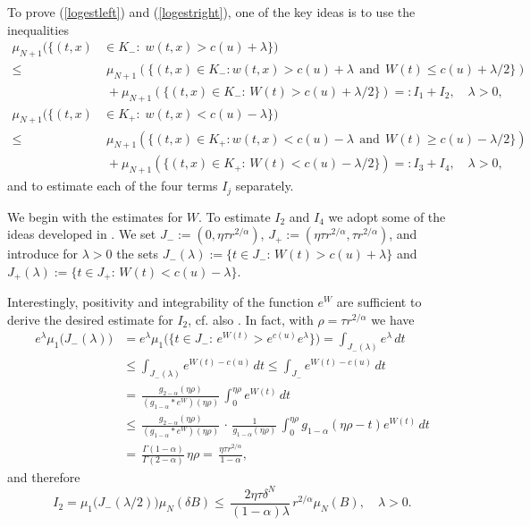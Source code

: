\documentclass[10pt]{article}
\begin{document}
To prove (\ref{logestleft}) and (\ref{logestright}), one of the
key ideas is to use the inequalities
\begin{align}
\mu_{N+1}(\{(t,x) & \in K_-:\; w(t,x)>c(u)+\lambda\})\nonumber\\
\le &\;\mu_{N+1}(\{(t,x)\in K_-:
w(t,x)>c(u)+\lambda\;\,\mbox{and}\,\;W(t)\le c(u)+\lambda/2 \})\nonumber\\
&\; +\mu_{N+1}(\{(t,x)\in K_-:\,W(t)> c(u)+\lambda/2
\})=:I_1+I_2,\quad \lambda>0,\label{mainleft}\\
\mu_{N+1}(\{(t,x) & \in K_+:\; w(t,x)<c(u)-\lambda\})\nonumber\\
\le &\;\mu_{N+1}(\{(t,x)\in K_+:
w(t,x)<c(u)-\lambda\;\,\mbox{and}\,\;W(t)\ge c(u)-\lambda/2 \})\nonumber\\
&\; +\mu_{N+1}(\{(t,x)\in K_+:\,W(t)< c(u)-\lambda/2
\})=:I_3+I_4,\quad \lambda>0,\label{mainright}
\end{align}
and to estimate each of the four terms $I_j$ separately.

We begin with the estimates for $W$. To estimate $I_2$ and $I_4$ we
adopt some of the ideas developed in \cite{Za}. We set $J_-:=(0,\eta
\tau r^{2/\alpha})$, $J_+:=(\eta\tau r^{2/\alpha},\tau
r^{2/\alpha})$, and introduce for $\lambda>0$ the sets
$J_-(\lambda):=\{t\in J_-:\,W(t)> c(u)+\lambda \}$ and
$J_+(\lambda):=\{t\in J_+:\,W(t)< c(u)-\lambda \}$.

Interestingly, positivity and integrability of the function $e^W$
are sufficient to derive the desired estimate for $I_2$, cf. also
\cite[Theorem 2.3]{Za}. In fact, with $\rho=\tau r^{2/\alpha}$ we
have
\begin{align*}
e^\lambda \mu_1\big(J_-(\lambda)\big) & =
e^\lambda\mu_1\big(\{t\in J_-:\,
e^{W(t)}>e^{c(u)}e^{\lambda}\}\big)=\int_{J_-(\lambda)}e^\lambda \,dt\\
& \le \int_{J_-(\lambda)}e^{W(t)-c(u)} \,dt\le
\int_{J_-}e^{W(t)-c(u)} \,dt\\
& = \,\frac{g_{2-\alpha}(\eta\rho)}{(g_{1-\alpha}\ast
e^W)(\eta\rho)}\,\int_0^{\eta\rho}e^{W(t)}\,dt\\
& \le \,\frac{g_{2-\alpha}(\eta\rho)}{(g_{1-\alpha}\ast
e^W)(\eta\rho)}\,\cdot\,\frac{1}{g_{1-\alpha}(\eta\rho)}\,
\int_0^{\eta\rho}g_{1-\alpha}(\eta\rho-t)e^{W(t)}\,dt\\
& =
\,\frac{\Gamma(1-\alpha)}{\Gamma(2-\alpha)}\,\eta\rho=\,\frac{\eta\tau
r^{2/\alpha}}{1-\alpha},
\end{align*}
and therefore
\begin{equation} \label{I2est}
I_2=\mu_1\big(J_-(\lambda/2)\big)\mu_N(\delta B)\le\,\frac{2\eta\tau
\delta^N}{(1-\alpha)\lambda}\,r^{2/\alpha}\mu_N(B),\quad \lambda>0.
\end{equation}
\end{document}
